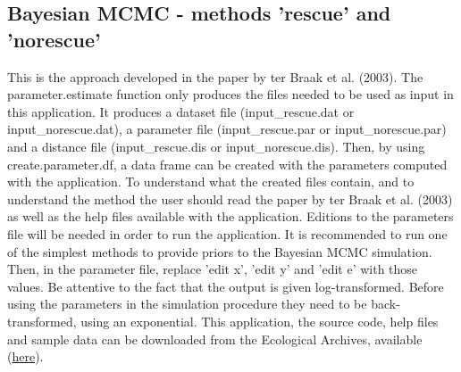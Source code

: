 \documentclass{article}\usepackage[]{graphicx}\usepackage[]{xcolor}
\begin{document}
\subsection{Bayesian MCMC - methods 'rescue' and 'norescue'}

This is the approach developed in the paper by ter Braak et al. (2003). The parameter.estimate function only produces the files needed to be used as input in this application. It produces a dataset file (input\_rescue.dat or input\_norescue.dat), a parameter file (input\_rescue.par or input\_norescue.par) and a distance file (input\_rescue.dis or input\_norescue.dis). Then, by using create.parameter.df, a data frame can be created with the parameters computed with the application. To understand what the created files contain, and to understand the method the user should read the paper by ter Braak et al. (2003) as well as the help files available with the application. Editions to the parameters file will be needed in order to run the application. It is recommended to run one of the simplest methods to provide priors to the Bayesian MCMC simulation. Then, in the parameter file, replace 'edit x', 'edit y' and 'edit e' with those values.  
Be attentive to the fact that the output is given log-transformed. Before using the parameters in the simulation procedure they need to be back-transformed, using an exponential.
This application, the source code, help files and sample data can be downloaded from the Ecological Archives, available (\href{http://www.esapubs.org/archive/ecol/E084/005/}{here}).
\end{document}
